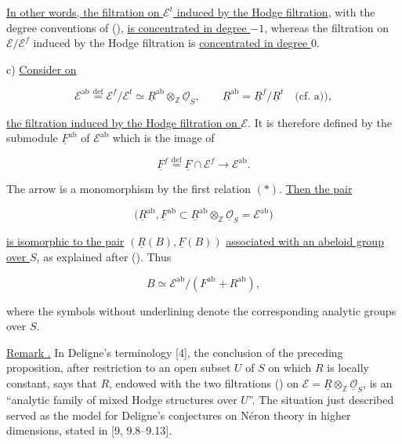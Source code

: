 \noindent
\underline{In other words, the filtration on $\mathcal E^t$ induced by
the Hodge filtration}, with the degree conventions of (),
\underline{is concentrated in degree $-1$}, whereas the filtration on
$\mathcal E/\mathcal E^f$ induced by the Hodge filtration is
\underline{concentrated in degree $0$}.

\smallskip
\noindent
c) \underline{Consider on}

\begin{equation*}
 \mathcal E^{\mathrm{ab}}
 \stackrel{\mathrm{def}}{=}\mathcal E^f/\mathcal E^t
 \simeq\underline R^{\mathrm{ab}}\otimes_{\mathbb Z}
 \underline{\mathcal O}_S,
 \qquad
 \underline R^{\mathrm{ab}}=\underline R^f/\underline R^t
 \quad\text{(cf. a))},
\end{equation*}

\noindent
\underline{the filtration induced by the Hodge filtration on
$\mathcal E$}.  It is therefore defined by the submodule
$\underline F^{\mathrm{ab}}$ of $\mathcal E^{\mathrm{ab}}$ which is the
image of

\begin{equation*}
 \underline F^f\stackrel{\mathrm{def}}{=}
 \underline F\cap\mathcal E^f\longrightarrow\mathcal E^{\mathrm{ab}}.
\end{equation*}

\noindent
The arrow is a monomorphism by the first relation $(*)$.
\underline{Then the pair}

\begin{equation*}
 \bigl(\underline R^{\mathrm{ab}},
 \underline F^{\mathrm{ab}}\subset
 \underline R^{\mathrm{ab}}\otimes_{\mathbb Z}
 \underline{\mathcal O}_S=\mathcal E^{\mathrm{ab}}\bigr)
\end{equation*}

\noindent
\underline{is isomorphic to the pair}
$(\underline R(B),\underline F(B))$
\underline{associated with an abeloid group over $S$}, as explained
after ().  Thus

\begin{equation*}
 B\simeq\mathcal E^{\mathrm{ab}}/
 (F^{\mathrm{ab}}+R^{\mathrm{ab}}),
\end{equation*}

\noindent
where the symbols without underlining denote the corresponding analytic
groups over $S$.

\medskip
\noindent
\underline{Remark .} In Deligne's terminology [4], the conclusion
of the preceding proposition, after restriction to an open subset $U$
of $S$ on which $R$ is locally constant, says that $R$, endowed with the
two filtrations () on
$\mathcal E=\underline R\otimes_{\mathbb Z}\underline{\mathcal O}_S$,
is an ``analytic family of mixed Hodge structures over $U$''.  The
situation just described served as the model for Deligne's conjectures
on N\'eron theory in higher dimensions, stated in [9, 9.8--9.13].

